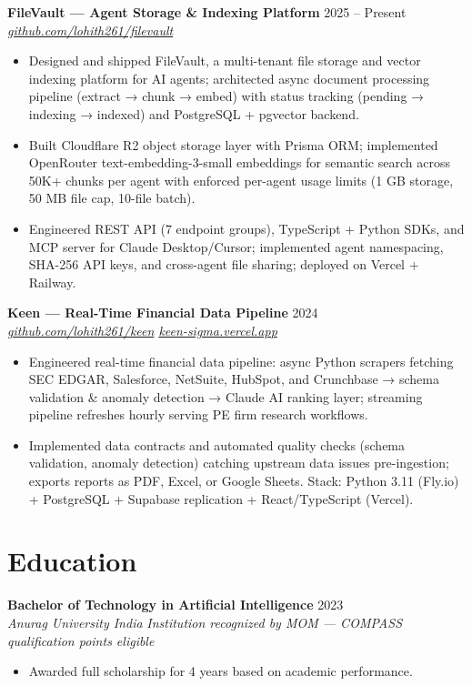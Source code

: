\documentclass[10pt,letterpaper]{article}
\newcommand{\entry}[3]{%
  \vspace{3pt}\textbf{#1} \hfill #3 \\
  \textit{\small #2}\vspace{1pt}}
\begin{document}
\entry{FileVault --- Agent Storage \& Indexing Platform}{\href{https://github.com/lohith261/filevault}{github.com/lohith261/filevault}}{2025 -- Present}
\begin{itemize}
  \item Designed and shipped FileVault, a multi-tenant file storage and vector indexing platform for AI agents; architected async document processing pipeline (extract → chunk → embed) with status tracking (pending → indexing → indexed) and PostgreSQL + pgvector backend.
  \item Built Cloudflare R2 object storage layer with Prisma ORM; implemented OpenRouter text-embedding-3-small embeddings for semantic search across 50K+ chunks per agent with enforced per-agent usage limits (1 GB storage, 50 MB file cap, 10-file batch).
  \item Engineered REST API (7 endpoint groups), TypeScript + Python SDKs, and MCP server for Claude Desktop/Cursor; implemented agent namespacing, SHA-256 API keys, and cross-agent file sharing; deployed on Vercel + Railway.
\end{itemize}

\entry{Keen --- Real-Time Financial Data Pipeline}{\href{https://github.com/lohith261/keen}{github.com/lohith261/keen} \quad\textbullet\quad \href{https://keen-sigma.vercel.app/}{keen-sigma.vercel.app}}{2024}
\begin{itemize}
  \item Engineered real-time financial data pipeline: async Python scrapers fetching SEC EDGAR, Salesforce, NetSuite, HubSpot, and Crunchbase → schema validation \& anomaly detection → Claude AI ranking layer; streaming pipeline refreshes hourly serving PE firm research workflows.
  \item Implemented data contracts and automated quality checks (schema validation, anomaly detection) catching upstream data issues pre-ingestion; exports reports as PDF, Excel, or Google Sheets. Stack: Python 3.11 (Fly.io) + PostgreSQL + Supabase replication + React/TypeScript (Vercel).
\end{itemize}

\section{Education}

\entry{Bachelor of Technology in Artificial Intelligence}{Anurag University \textbullet{} India}{2023}
\newline\textit{\small Institution recognized by MOM --- COMPASS qualification points eligible}
\begin{itemize}
  \item Awarded full scholarship for 4 years based on academic performance.
\end{itemize}
\end{document}
